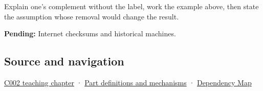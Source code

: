 Explain one's complement without the label, work the example above, then state the assumption whose removal would change the result.

\textbf{Pending:} Internet checksums and historical machines.

\subsection{Source and navigation}\label{appendix-03c678cd40b3-source-and-navigation}

\hyperref[01-foundations-i-ch001-arithmetic-becomes-a-policy]{C002 teaching chapter} · \hyperref[appendix-fd090d982a15]{Part definitions and mechanisms} · \hyperref[appendix-4ad47bdd269a]{Dependency Map}
